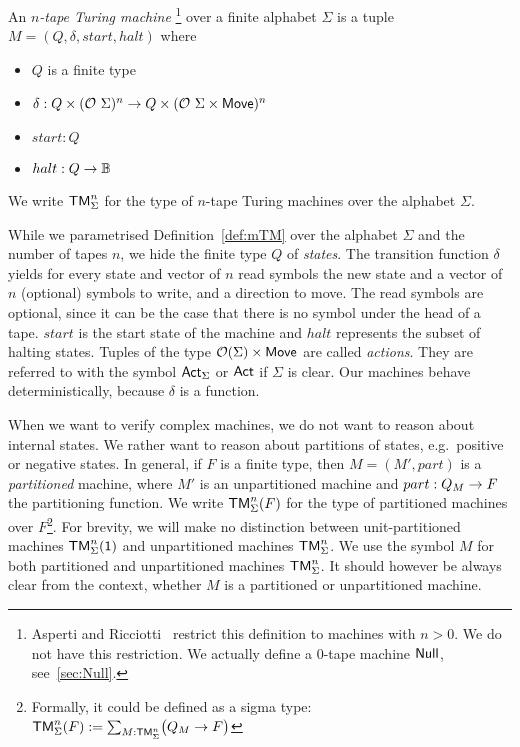 \begin{definition}
  \label{def:mTM}
  An \emph{$n$-tape Turing machine} \footnote{Asperti and Ricciotti~\cite{asperti2015} restrict this definition to machines with $n>0$.  We do not
    have this restriction.  We actually define a $0$-tape machine $\textsf{Null}$, see~\ref{sec:Null}.}  over a finite alphabet $\Sigma$ is a tuple
  $M = (Q, \delta, start, halt)$ where
  \begin{itemize}
  \item $Q$ is a finite type
  \item $\delta : Q \times (\mathcal{O}~\Sigma)^n \rightarrow Q \times (\mathcal{O}~\Sigma \times \textsf{Move})^n$
  \item $start:Q$
  \item $halt : Q \rightarrow \mathbb{B}$ 
  \end{itemize}
\end{definition}

We write $\textsf{TM}_\Sigma^n$ for the type of $n$-tape Turing machines over the alphabet $\Sigma$.

While we parametrised Definition~\ref{def:mTM} over the alphabet $\Sigma$ and the number of tapes $n$, we hide the finite type $Q$ of \emph{states}.
The transition function $\delta$ yields for every state and vector of $n$ read symbols the new state and a vector of $n$ (optional) symbols to write,
and a direction to move.  The read symbols are optional, since it can be the case that there is no symbol under the head of a tape.  $start$ is the
start state of the machine and $halt$ represents the subset of halting states.  Tuples of the type $\mathcal{O}(\Sigma) \times \textsf{Move}$ are called
\emph{actions}.  They are referred to with the symbol $\textsf{Act}_\Sigma$ or $\textsf{Act}$ if $\Sigma$ is clear.  Our machines behave deterministically,
because $\delta$ is a function.

When we want to verify complex machines, we do not want to reason about internal states.  We rather want to reason about partitions of states, e.g.\
positive or negative states.  In general, if $F$ is a finite type, then $M = (M', part)$ is a \emph{partitioned} machine, where $M'$ is an
unpartitioned machine and $part : Q_M \rightarrow F$ the partitioning function.  We write $\textsf{TM}_\Sigma^n(F)$ for the type of partitioned machines over
$F$\footnote{Formally, it could be defined as a sigma type: $\textsf{TM}_\Sigma^n(F) := \sum_{M:\textsf{TM}_\Sigma^n}\bigl(Q_M \rightarrow F\bigr)$}.  For brevity, we
will make no distinction between unit-partitioned machines $\textsf{TM}_\Sigma^n(\textsf{1})$ and unpartitioned machines $\textsf{TM}_\Sigma^n$.  We use the symbol $M$ for
both partitioned and unpartitioned machines $\textsf{TM}_\Sigma^n$.  It should however be always clear from the context, whether $M$ is a partitioned or
unpartitioned machine.

